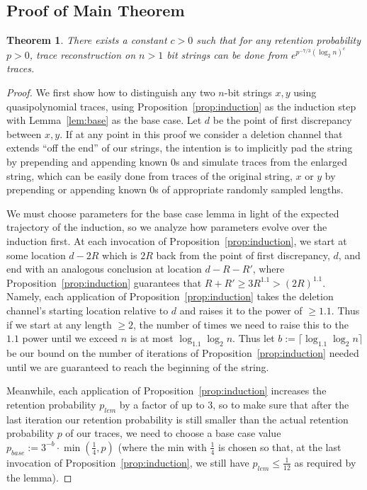 \documentclass[11pt]{article}
\theoremstyle{plain}
\newtheorem{theorem}{Theorem}
\begin{document}
\subsection{Proof of Main Theorem}
\begin{theorem}\label{thm:main}
There exists a constant $c>0$ such that for any retention probability $p>0$, trace reconstruction on $n>1$ bit strings can be done from $e^{p^{-7/3}(\log_2 n)^c}$ traces.
\end{theorem}

\begin{proof}
We first show how to distinguish any two $n$-bit strings $x,y$ using quasipolynomial traces, using Proposition~\ref{prop:induction} as the induction step with Lemma~\ref{lem:base} as the base case. Let $d$ be the point of first discrepancy between $x,y$. If at any point in this proof we consider a deletion channel that extends ``off the end'' of our strings, the intention is to implicitly pad the string by prepending and appending known 0s and simulate traces from the enlarged string, which can be easily done from traces of the original string, $x$ or $y$ by prepending or appending known 0s of appropriate randomly sampled lengths.

We must choose parameters for the base case lemma in light of the expected trajectory of the induction, so we analyze how parameters evolve over the induction first. At each invocation of Proposition~\ref{prop:induction}, we start at some location $d-2R$ which is $2R$ back from the point of first discrepancy, $d$, and end with an analogous conclusion at location $d-R-R'$, where Proposition~\ref{prop:induction} guarantees that $R+R'\geq 3R^{1.1}>(2R)^{1.1}$. Namely, each application of Proposition~\ref{prop:induction} takes the deletion channel's starting location relative to $d$ and raises it to the power of $\geq 1.1$. Thus if we start at any length $\geq 2$, the number of times we need to raise this to the $1.1$ power until we exceed $n$ is at most $\log_{1.1} \log_2 n$. Thus let $b:=\lceil\log_{1.1} \log_2 n\rceil$ be our bound on the number of iterations of Proposition~\ref{prop:induction} needed until we are guaranteed to reach the beginning of the string.

Meanwhile, each application of Proposition~\ref{prop:induction} increases the retention probability $p_{lem}$ by a factor of up to 3, so to make sure that after the last iteration our retention probability is still smaller than the actual retention probability $p$ of our traces, we need to choose a base case value $p_{base}:=3^{-b}\cdot \min(\frac{1}{4},p)$ (where the min with $\frac{1}{4}$ is chosen so that, at the last invocation of Proposition~\ref{prop:induction}, we still have $p_{lem}\leq\frac{1}{12}$ as required by the lemma).


\end{proof}
\end{document}

